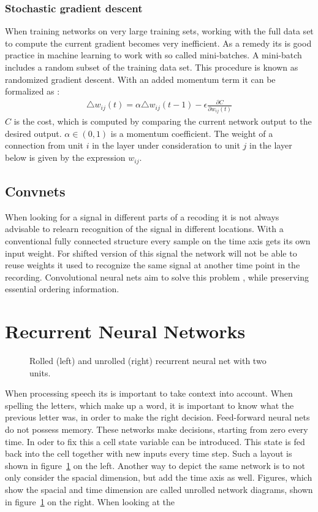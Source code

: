 \subsubsection{Stochastic gradient descent}
When training networks on very large training sets, working with the full data set to compute the current gradient becomes very inefficient. As a remedy its is good practice in machine learning to work with so called mini-batches. A mini-batch includes a random subset of the training data set. This procedure is known as randomized gradient descent. With an added momentum term it can be formalized as \cite[page 4]{Hinton2012}:
\begin{align}
\triangle w_{ij}(t) = \alpha \triangle w_{ij}(t-1) - \epsilon \frac{\partial C}{\partial w_{ij}(t)}
\end{align}
$C$ is the cost, which is computed by comparing the current network output to the desired output. $\alpha \in (0,1)$ is a momentum coefficient. The weight of a connection from unit $i$ in the layer under consideration to unit $j$ in the layer below is given by the expression $w_{ij}$.

\subsection{Convnets}
When looking for a signal in different parts of a recoding it is not always advisable to relearn recognition
of the signal in different locations. With a conventional fully connected structure every sample on the time axis gets its own input weight. For shifted version of this signal the network will not be able to reuse weights it used
to recognize the same signal at another time point in the recording.
Convolutional neural nets aim to solve this problem \cite[page 6]{Dumoulin2016}, while preserving essential ordering information.

\section{Recurrent Neural Networks}
\begin{figure}
\centering

\caption{Rolled (left) and unrolled (right) recurrent neural net with two units.}
\label{fig:unrolledNet}
\end{figure}
When processing speech its is important to take context into account. When spelling the letters, which make up a word, it is important to know what the previous letter was, in order to make the right decision. 
Feed-forward neural nets do not possess memory. These networks make decisions, starting from zero every time. In oder to fix this a cell state variable can be introduced. This state is fed back into the cell together with new inputs every time step. Such a layout is shown in figure~\ref{fig:unrolledNet} on the left. 
Another way to depict the same network is to not only consider the spacial dimension, but add the time axis as well. Figures, which show the spacial and time dimension are called unrolled network diagrams, shown in figure~\ref{fig:unrolledNet} on the right. When looking at the 



